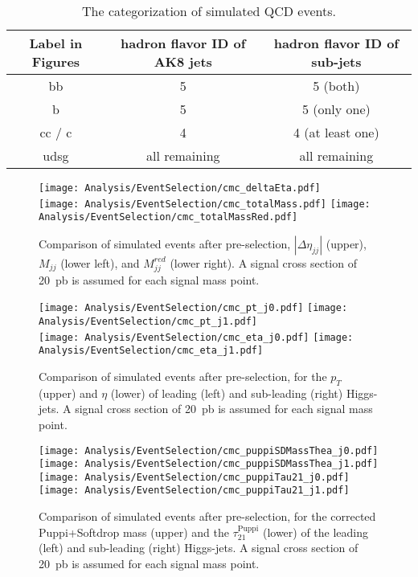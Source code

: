 \begin{table}[htb]
\begin{center}
    \begin{tabular}{c c c}
    \hline
    \hline
    Label in Figures &  hadron flavor ID of AK8 jets & hadron flavor ID of sub-jets  \\
    \hline
    bb & 5 & 5 (both) \\
    b & 5 & 5 (only one) \\
    cc / c & 4 & 4 (at least one) \\
    udsg & all remaining & all remaining \\
    \hline
    \hline
    \end{tabular}
    \caption[The categorization of simulated QCD events.]{The categorization of simulated QCD events. \label{tab:qcdflavor}}
\end{center}
\end{table}

\begin{figure}[H]
\centering
\texttt{[image: Analysis/EventSelection/cmc\_deltaEta.pdf]} \\
\texttt{[image: Analysis/EventSelection/cmc\_totalMass.pdf]}
\texttt{[image: Analysis/EventSelection/cmc\_totalMassRed.pdf]}
\caption{ Comparison of simulated events after pre-selection, $|\Delta\eta_{jj}|$ (upper), $M_{jj}$ (lower left), and $M_{jj}^{red}$ (lower right). A signal cross section of 20~pb is assumed for each signal mass point.
\label{fig:eventToplogy_prebtag}
}
\end{figure}

\begin{figure}[H]
\centering
\texttt{[image: Analysis/EventSelection/cmc\_pt\_j0.pdf]}
\texttt{[image: Analysis/EventSelection/cmc\_pt\_j1.pdf]} \\
\texttt{[image: Analysis/EventSelection/cmc\_eta\_j0.pdf]}
\texttt{[image: Analysis/EventSelection/cmc\_eta\_j1.pdf]}
\caption{ Comparison of simulated events after pre-selection, for the $p_{T}$ (upper) and $\eta$ (lower) of
 leading (left) and sub-leading (right) Higgs-jets.
A signal cross section of 20~pb is assumed for each signal mass point.
\label{fig:higgsjet_prebtag}
}

\end{figure}
\begin{figure}[H]
\centering
\texttt{[image: Analysis/EventSelection/cmc\_puppiSDMassThea\_j0.pdf]}
\texttt{[image: Analysis/EventSelection/cmc\_puppiSDMassThea\_j1.pdf]} \\
\texttt{[image: Analysis/EventSelection/cmc\_puppiTau21\_j0.pdf]}
\texttt{[image: Analysis/EventSelection/cmc\_puppiTau21\_j1.pdf]}
\caption{ Comparison of simulated events after pre-selection, for the corrected Puppi+Softdrop mass (upper)
 and the $\tau_{21}^\mathrm{Puppi}$ (lower) of the leading (left) and sub-leading (right) Higgs-jets.
 A signal cross section of 20~pb is assumed for each signal mass point.
\label{fig:uncorrsd_prebtag}
}
\end{figure}

